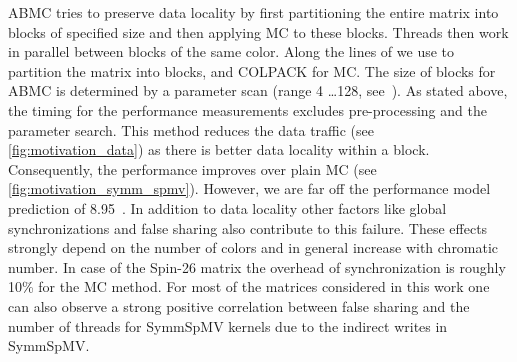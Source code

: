 \Acrfull{ABMC} tries to preserve data locality by first partitioning
the entire matrix into blocks of specified size and then
applying \acrlong{MC} to these blocks. Threads then work in parallel
between blocks of the same color. Along the lines of \cite{Park_HPCG} 
we use \METIS \cite{METIS} to partition the matrix into blocks, and COLPACK 
for \acrlong{MC}. The size of blocks for \acrshort{ABMC} is
determined by a parameter scan (range 4 \ldots 128,
see~\cite{ABMC})\@. As stated above, the timing for the performance measurements
excludes pre-processing and the parameter search. This method reduces the 
data traffic (see \cref{fig:motivation_data}) as there is better data
locality within a block. Consequently, the performance improves
over plain \acrshort{MC} (see \cref{fig:motivation_symm_spmv}). However,
we are far off the performance model prediction of 8.95~\GF. In
addition to data locality other factors like global synchronizations
and false sharing also contribute to this failure. These
effects strongly depend on the number of colors and in general
increase with chromatic number. In case of the Spin-26 matrix the overhead of
synchronization is roughly 10\% for the \acrshort{MC} method.  For most of
the matrices considered in this work one can also observe a strong
positive correlation between false sharing and the number of threads
for \acrshort{SymmSpMV} kernels due to the indirect writes
in \acrshort{SymmSpMV}.
 
 



